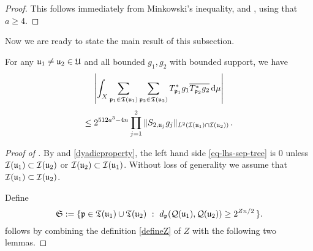 \begin{proof}
    \leanok
    This follows immediately from Minkowski's inequality,  and , using that $a \ge 4$.
\end{proof}


Now we are ready to state the main result of this subsection.

\begin{lemma}
    \label{correlation-separated-trees}
    \leanok
    For any ${\mathfrak u}_1 \ne {\mathfrak u}_2 \in {\mathfrak U}$ and all bounded $g_1, g_2$ with bounded support, we have
    \begin{equation}
        \label{eq-lhs-sep-tree}
        \left| \int_X \sum_{{\mathfrak p}_1 \in {\mathfrak T}({\mathfrak u}_1)} \sum_{{\mathfrak p}_2 \in {\mathfrak T}({\mathfrak u}_2)} T^*_{{\mathfrak p}_1}g_1 \overline{T^*_{{\mathfrak p}_2}g_2 }\,\mathrm{d}\mu \right|
    \end{equation}
    \begin{equation}
        \label{eq-rhs-sep-tree}
        \le 2^{512a^3-4n} \prod_{j =1}^2 \| S_{2, {\mathfrak u}_j} g_j\|_{L^2({\mathcal{I}}({\mathfrak u}_1) \cap {\mathcal{I}}({\mathfrak u}_2))}\,.
    \end{equation}
\end{lemma}

\begin{proof}[Proof of ]
    \leanok
    By  and \eqref{dyadicproperty}, the left hand side \eqref{eq-lhs-sep-tree} is $0$ unless ${\mathcal{I}}({\mathfrak u}_1) \subset {\mathcal{I}}({\mathfrak u}_2)$ or ${\mathcal{I}}({\mathfrak u}_2) \subset {\mathcal{I}}({\mathfrak u}_1)$. Without loss of generality we assume that ${\mathcal{I}}({\mathfrak u}_1) \subset {\mathcal{I}}({\mathfrak u}_2)$.

    Define
    \begin{equation}
        \label{def-Tree-S-set}
         \mathfrak{S} := \{\fp \in \fT(\fu_1) \cup \fT(\fu_2) \ : \ d_{\fp}(\fcc(\fu_1), \fcc(\fu_2)) \ge 2^{Zn/2}\,\}.
    \end{equation}
     follows by combining the definition \eqref{defineZ} of $Z$ with the following two lemmas.
\end{proof}

